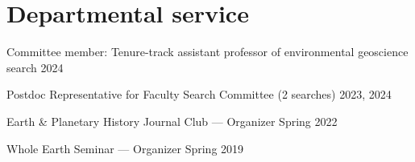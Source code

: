 \section{Departmental service}


Committee member: Tenure-track assistant professor of environmental geoscience search \hfill 2024

Postdoc Representative for Faculty Search Committee (2 searches) \hfill 2023, 2024

Earth \& Planetary History Journal Club --- Organizer 	 \hfill	Spring 2022

Whole Earth Seminar --- Organizer \hfill  Spring 2019
